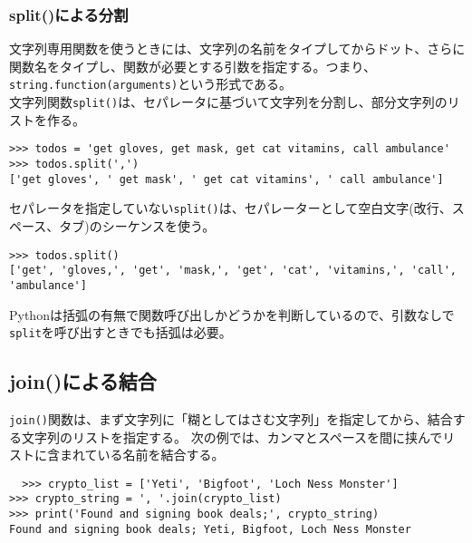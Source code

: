\documentclass[11pt, oneside]{article}   	%
\begin{document}
 \subsubsection{split()による分割}
 文字列専用関数を使うときには、文字列の名前をタイプしてからドット、さらに関数名をタイプし、関数が必要とする引数を指定する。つまり、\verb|string.function(arguments)|という形式である。\\
 文字列関数\verb|split()|は、セパレータに基づいて文字列を分割し、部分文字列のリストを作る。
 \begin{lstlisting}
>>> todos = 'get gloves, get mask, get cat vitamins, call ambulance'
>>> todos.split(',')
['get gloves', ' get mask', ' get cat vitamins', ' call ambulance']
 \end{lstlisting}
 セパレータを指定していない\verb|split()|は、セパレーターとして空白文字(改行、スペース、タブ)のシーケンスを使う。
 \begin{lstlisting}
>>> todos.split()
['get', 'gloves,', 'get', 'mask,', 'get', 'cat', 'vitamins,', 'call', 'ambulance']
\end{lstlisting}
 Pythonは括弧の有無で関数呼び出しかどうかを判断しているので、引数なしで\verb|split|を呼び出すときでも括弧は必要。
 
 \subsection{join()による結合}
 \verb|join()|関数は、まず文字列に「糊としてはさむ文字列」を指定してから、結合する文字列のリストを指定する。
 次の例では、カンマとスペースを間に挟んでリストに含まれている名前を結合する。
  \begin{lstlisting}
  >>> crypto_list = ['Yeti', 'Bigfoot', 'Loch Ness Monster']
>>> crypto_string = ', '.join(crypto_list)
>>> print('Found and signing book deals;', crypto_string)
Found and signing book deals; Yeti, Bigfoot, Loch Ness Monster
  \end{lstlisting}
  
\end{document}
